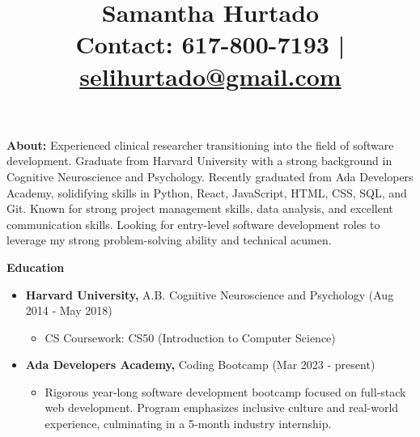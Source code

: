 \documentclass[a4paper,10pt]{article}
\title{\vspace{-3cm}Samantha Hurtado \\ \vspace{3mm} \normalsize \textbf{Contact:} 617-800-7193 | \href{mailto:selihurtado@gmail.com}{selihurtado@gmail.com}}
\date{\vspace{-5ex}}
\begin{document}
\maketitle


\noindent
\textbf{About:} Experienced clinical researcher transitioning into the field of software development. Graduate from Harvard University with a strong background in Cognitive Neuroscience and Psychology. Recently graduated from Ada Developers Academy, solidifying skills in Python, React, JavaScript, HTML, CSS, SQL, and Git. Known for strong project management skills, data analysis, and excellent communication skills. Looking for entry-level software development roles to leverage my strong problem-solving ability and technical acumen.\\

\vspace{8pt}

\noindent
\textbf{Education}
\begin{itemize}[noitemsep,topsep=0pt,parsep=0pt,partopsep=0pt,itemsep=2pt,after=\vspace{\baselineskip}]
\item \textbf{Harvard University,} A.B. Cognitive Neuroscience and Psychology (Aug 2014 - May 2018)
\begin{itemize}[noitemsep,topsep=0pt,parsep=0pt,partopsep=0pt,itemsep=2pt]
\item CS Coursework: CS50 (Introduction to Computer Science)
\end{itemize}
\item \textbf{Ada Developers Academy,} Coding Bootcamp (Mar 2023 - present)
    
\begin{itemize}[noitemsep,topsep=0pt,parsep=0pt,partopsep=0pt,itemsep=2pt]
\item Rigorous year-long software development bootcamp focused on full-stack web development. Program emphasizes inclusive culture and real-world experience, culminating in a 5-month industry internship.
\end{itemize}


\end{itemize}

\vspace{8pt}
\end{document}
